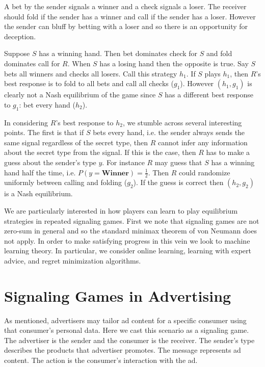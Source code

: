 \documentclass{article}
\begin{document}
A bet by the sender signals a winner and a check signals a loser. The receiver should fold if the sender has a winner and call if the sender has a loser. However the sender can bluff by betting with a loser and so there is an opportunity for deception.

Suppose $S$ has a winning hand. Then bet dominates check for $S$ and fold dominates call for $R$. When $S$ has a losing hand then the opposite is true. Say $S$ bets all winners and checks all losers. Call this strategy $h_1$. If $S$ plays $h_1$, then $R$'s best response is to fold to all bets and call all checks ($g_1$). However $(h_1, g_1)$ is clearly not a Nash equilibrium of the game since $S$ has a different best response to $g_1$: bet every hand ($h_2$).

In considering $R$'s best response to $h_2$, we stumble across several interesting points. The first is that if $S$ bets every hand, i.e. the sender always sends the same signal regardless of the secret type, then $R$ cannot infer any information about the secret type from the signal. If this is the case, then $R$ has to make a guess about the sender's type $y$. For instance $R$ may guess that $S$ has a winning hand half the time, i.e. $P(y = \textbf{Winner}) = \frac{1}{2}$. Then $R$ could randomize uniformly between calling and folding ($g_2$). If the guess is correct then $(h_2, g_2)$ is a Nash equilibrium.



We are particularly interested in how players can learn to play equilibrium strategies in repeated signaling games. First we note that signaling games are not zero-sum in general and so the standard minimax theorem of von Neumann does not apply. In order to make satisfying progress in this vein we look to machine learning theory. In particular, we consider online learning, learning with expert advice, and regret minimization algorithms.

\section{Signaling Games in Advertising}

As mentioned, advertisers may tailor ad content for a specific consumer using that consumer's personal data. Here we cast this scenario as a signaling game. The advertiser is the sender and the consumer is the receiver. The sender's type describes the products that advertiser promotes. The message represents ad content. The action is the consumer's interaction with the ad.
\end{document}
